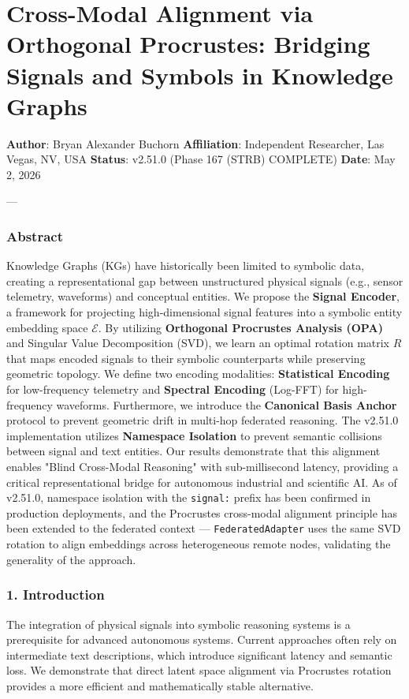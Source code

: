 \section{Cross-Modal Alignment via Orthogonal Procrustes: Bridging Signals and Symbols in Knowledge Graphs}

\textbf{Author}: Bryan Alexander Buchorn  
\textbf{Affiliation}: Independent Researcher, Las Vegas, NV, USA  
\textbf{Status}: v2.51.0 (Phase 167 (STRB) COMPLETE)
\textbf{Date}: May 2, 2026

---

\subsubsection{Abstract}
Knowledge Graphs (KGs) have histo\-rically been limited to symbolic data, creating a repre\-sentational gap between unstr\-uctured physical signals (e.g., sensor telemetry, waveforms) and conceptual entities. We propose the \textbf{Signal Encoder}, a framework for projecting high-dimensional signal features into a symbolic entity embedding space $\mathcal{E}$. By utilizing \textbf{Orthogonal Procrustes Analysis (OPA)} \cite{schonemann1966procrustes, gower2004procrustes} and Singular Value Decomp\-osition (SVD), we learn an optimal rotation matrix $R$ that maps encoded signals to their symbolic count\-erparts while preserving geometric topology. We define two encoding modalities: \textbf{Statistical Encoding} for low-frequency telemetry and \textbf{Spectral Encoding} (Log-FFT) for high-frequency waveforms. Furthermore, we introduce the \textbf{Canonical Basis Anchor} protocol to prevent geometric drift in multi-hop federated reasoning. The v2.51.0 imple\-mentation utilizes \textbf{Namespace Isolation} to prevent semantic collisions between signal and text entities. Our results demonstrate that this alignment enables "Blind Cross-Modal Reasoning" with sub-millisecond latency, providing a critical repre\-sentational bridge for autonomous industrial and scientific AI. As of v2.51.0, namespace isolation with the \texttt{signal:} prefix has been confirmed in production deployments, and the Procrustes cross-modal alignment principle has been extended to the federated context — \texttt{FederatedAdapter} uses the same SVD rotation to align embeddings across heter\-ogeneous remote nodes, validating the generality of the approach.

\subsubsection{1. Introd\-uction}
The integration of physical signals into symbolic reasoning systems is a prere\-quisite for advanced autonomous systems. Current approaches often rely on inter\-mediate text descr\-iptions, which introduce significant latency and semantic loss. We demonstrate that direct latent space alignment via Procrustes rotation provides a more efficient and mathe\-matically stable alternative.

